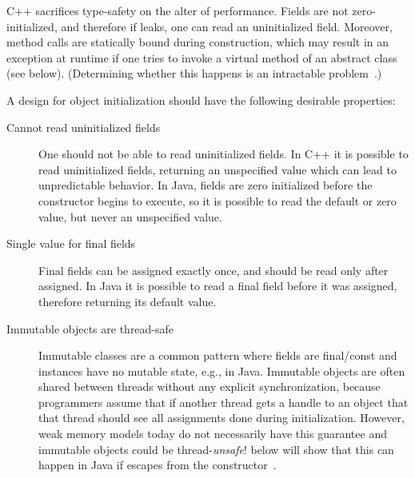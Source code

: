 \mbox{C++} sacrifices type-safety on the alter of performance. %
Fields are not zero-initialized, and therefore if \this leaks,
    one can read an uninitialized field.
Moreover, method calls are statically bound during construction,
    which may result in an exception at runtime
    if one tries to invoke a virtual method of an abstract class (see  below).
(Determining whether this happens is an intractable problem~\cite{Gil:1998:CTA:646155.679689}.)

A design for object initialization should have the following
    desirable properties:

\begin{description}

  \item[Cannot read uninitialized fields]
    One should not be able to read uninitialized fields.
    In \mbox{C++} it is possible to read uninitialized fields,
        returning an unspecified value which can lead to unpredictable behavior.
    In Java, fields are zero initialized before the constructor begins to execute,
        so it is possible to read the default or zero value,
        but never an unspecified value.

  \item[Single value for final fields]
    Final fields can be assigned exactly once, and
        should be read only after assigned.
    In Java it is possible to read a final field before it was assigned,
        therefore returning its default value.

  \item[Immutable objects are thread-safe]
    Immutable classes are a common pattern where fields are final/const
        and instances have no mutable state, e.g.,  in Java.
    Immutable objects are often shared between threads without any explicit synchronization,
        because programmers assume that if another thread gets a handle to an object
        that that thread should see all assignments done during initialization.
    However, weak memory models today do not necessarily have this guarantee
        and immutable objects could be thread-\emph{unsafe}!
     below will show that this can happen in Java
        if \this escapes from the constructor~\cite{JSR133}.


\end{description}
